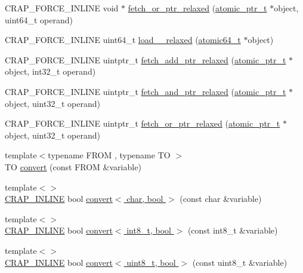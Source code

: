 \begin{DoxyCompactItemize}
\item 
C\+R\+A\+P\+\_\+\+F\+O\+R\+C\+E\+\_\+\+I\+N\+L\+I\+N\+E void $\ast$ \hyperlink{namespacecrap_a3ce08fa76a5dc6fd7baaa059bf1abef5}{fetch\+\_\+or\+\_\+ptr\+\_\+relaxed} (\hyperlink{structcrap_1_1atomic__ptr__t}{atomic\+\_\+ptr\+\_\+t} $\ast$object, uint64\+\_\+t operand)
\item 
C\+R\+A\+P\+\_\+\+F\+O\+R\+C\+E\+\_\+\+I\+N\+L\+I\+N\+E uint64\+\_\+t \hyperlink{namespacecrap_a42e060337e4db7ca2a11b837ee41d7f1}{load\+\_\+\_\+relaxed} (\hyperlink{structcrap_1_1atomic64__t}{atomic64\+\_\+t} $\ast$object)
\item 
C\+R\+A\+P\+\_\+\+F\+O\+R\+C\+E\+\_\+\+I\+N\+L\+I\+N\+E uintptr\+\_\+t \hyperlink{namespacecrap_a34d204743b05b81dde81837f7c505df8}{fetch\+\_\+add\+\_\+ptr\+\_\+relaxed} (\hyperlink{structcrap_1_1atomic__ptr__t}{atomic\+\_\+ptr\+\_\+t} $\ast$object, int32\+\_\+t operand)
\item 
C\+R\+A\+P\+\_\+\+F\+O\+R\+C\+E\+\_\+\+I\+N\+L\+I\+N\+E uintptr\+\_\+t \hyperlink{namespacecrap_a0bb01b9c4981c61546b930bc6ff36d44}{fetch\+\_\+and\+\_\+ptr\+\_\+relaxed} (\hyperlink{structcrap_1_1atomic__ptr__t}{atomic\+\_\+ptr\+\_\+t} $\ast$object, uint32\+\_\+t operand)
\item 
C\+R\+A\+P\+\_\+\+F\+O\+R\+C\+E\+\_\+\+I\+N\+L\+I\+N\+E uintptr\+\_\+t \hyperlink{namespacecrap_a31b8b6da5f84a64fa1e35186e7929682}{fetch\+\_\+or\+\_\+ptr\+\_\+relaxed} (\hyperlink{structcrap_1_1atomic__ptr__t}{atomic\+\_\+ptr\+\_\+t} $\ast$object, uint32\+\_\+t operand)
\item 
{\footnotesize template$<$typename F\+R\+O\+M , typename T\+O $>$ }\\T\+O \hyperlink{namespacecrap_afe6bc6d7a278bda669ff709f655b8789}{convert} (const F\+R\+O\+M \&variable)
\item 
{\footnotesize template$<$$>$ }\\\hyperlink{config__x86_8h_a5a40526b8d842e7ff731509998bb0f1c}{C\+R\+A\+P\+\_\+\+I\+N\+L\+I\+N\+E} bool \hyperlink{namespacecrap_ac92695a46199663eabfa2f1a29e96475}{convert$<$ char, bool $>$} (const char \&variable)
\item 
{\footnotesize template$<$$>$ }\\\hyperlink{config__x86_8h_a5a40526b8d842e7ff731509998bb0f1c}{C\+R\+A\+P\+\_\+\+I\+N\+L\+I\+N\+E} bool \hyperlink{namespacecrap_aeb0c1bbaf9cb330ede0c702008805e30}{convert$<$ int8\+\_\+t, bool $>$} (const int8\+\_\+t \&variable)
\item 
{\footnotesize template$<$$>$ }\\\hyperlink{config__x86_8h_a5a40526b8d842e7ff731509998bb0f1c}{C\+R\+A\+P\+\_\+\+I\+N\+L\+I\+N\+E} bool \hyperlink{namespacecrap_a8b20a47b283dc5534122e5fe29631b3a}{convert$<$ uint8\+\_\+t, bool $>$} (const uint8\+\_\+t \&variable)

\end{DoxyCompactItemize}
